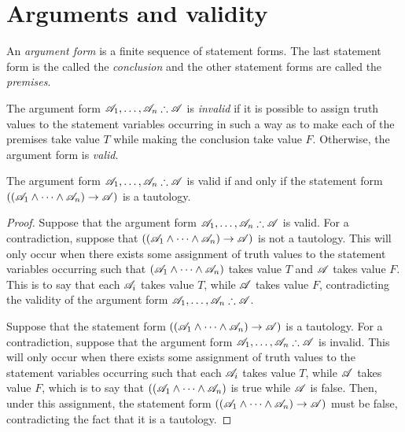 \section{Arguments and validity}

An \textit{argument form} is a finite sequence of statement forms. The last statement form is the called the \textit{conclusion} and the other statement forms are called the \textit{premises}.

\setcounter{definition}{27}
\begin{definition}
  The argument form \(\mathscr{A}_1, \dots, \mathscr{A}_n \therefore \mathscr{A}\) is \textit{invalid} if it is possible to assign truth values to the statement variables occurring in such a way as to make each of the premises take value \(T\) while making the conclusion take value \(F\). Otherwise, the argument form is \textit{valid}.
\end{definition}

\setcounter{definition}{31}
\begin{proposition}
  The argument form \(\mathscr{A}_1, \dots, \mathscr{A}_n \therefore \mathscr{A}\) is valid if and only if the statement form \(((\mathscr{A}_1 \land \dots \land \mathscr{A}_n) \rightarrow \mathscr{A})\) is a tautology.

  \begin{proof}
    \Ra{} Suppose that the argument form \(\mathscr{A}_1, \dots, \mathscr{A}_n \therefore \mathscr{A}\) is valid. For a contradiction, suppose that \(((\mathscr{A}_1 \land \dots \land \mathscr{A}_n) \rightarrow \mathscr{A})\) is not a tautology. This will only occur when there exists some assignment of truth values to the statement variables occurring such that \((\mathscr{A}_1 \land \dots \land \mathscr{A}_n)\) takes value \(T\) and \(\mathscr{A}\) takes value \(F\). This is to say that each \(\mathscr{A}_i\) takes value \(T\), while \(\mathscr{A}\) takes value \(F\), contradicting the validity of the argument form \(\mathscr{A}_1, \dots, \mathscr{A}_n \therefore \mathscr{A}\).

    \La{} Suppose that the statement form \(((\mathscr{A}_1 \land \dots \land \mathscr{A}_n) \rightarrow \mathscr{A})\) is a tautology. For a contradiction, suppose that the argument form \(\mathscr{A}_1, \dots, \mathscr{A}_n \therefore \mathscr{A}\) is invalid. This will only occur when there exists some assignment of truth values to the statement variables occurring such that each \(\mathscr{A}_i\) takes value \(T\), while \(\mathscr{A}\) takes value \(F\), which is to say that \(((\mathscr{A}_1 \land \dots \land \mathscr{A}_n)\) is true while \(\mathscr{A}\) is false. Then, under this assignment, the statement form \(((\mathscr{A}_1 \land \dots \land \mathscr{A}_n) \rightarrow \mathscr{A})\) must be false, contradicting the fact that it is a tautology.
  \end{proof}
\end{proposition}

